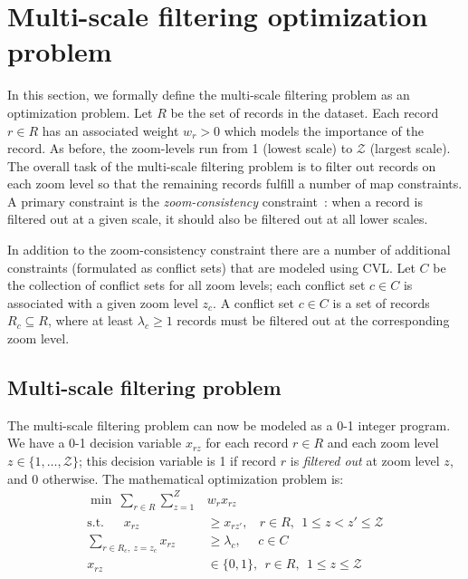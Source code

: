 \section{Multi-scale filtering optimization problem}
\label{sec:optimizationmodel}

In this section, we formally define the multi-scale filtering problem as an optimization problem. Let $R$ be the set of records in the dataset. Each record $r \in R$ has an associated weight $w_r > 0$ which models the importance of the record. As before, the zoom-levels run from 1 (lowest scale) to $\mathcal{Z}$ (largest scale). The overall task of the multi-scale filtering problem is to filter out records on each zoom level so that the remaining records fulfill a number of map constraints. A primary constraint is the \emph{zoom-consistency} constraint~\cite{sarma2012fusiontables}: when a record is filtered out at a given scale, it should also be filtered out at all lower scales. 

In addition to the zoom-consistency constraint there are a number of additional constraints (formulated as conflict sets) that are modeled using CVL. Let $C$ be the collection of conflict sets for all zoom levels; each conflict set $c \in C$ is associated with a given zoom level $z_c$. A conflict set $c \in C$ is a set of records $R_c \subseteq R$, where at least $\lambda_c \geq 1$ records must be filtered out at the corresponding zoom level. 



\subsection{Multi-scale filtering problem}

The multi-scale filtering problem can now be modeled as a 0-1 integer program. We have a 0-1 decision variable $x_{rz}$ for each record $r \in R$ and each zoom level $z \in \{1,\ldots, \mathcal{Z}\}$; this decision variable is 1 if record $r$ is \emph{filtered out} at zoom level $z$, and 0 otherwise. The mathematical optimization problem is:
\begin{align}
  \label{eq:objective}
  \min ~\sum_{r \in R} \sum_{z=1}^Z &w_r x_{rz} \\
  \label{eq:zoom-consistency}
  \mbox{s.t.}~~~~~~~x_{rz} &\geq x_{rz'}, ~~~~r \in R, ~~1 \leq z < z' \leq \mathcal{Z} \\
  \label{eq:general-constraints}
  \sum_{r \in R_c, ~z = z_c} x_{rz} &\geq \lambda_c, ~~~~~~ c \in C \\
  x_{rz} & \in \{0, 1\}, ~~ r \in R, ~~1 \leq z \leq \mathcal{Z}
\end{align}

